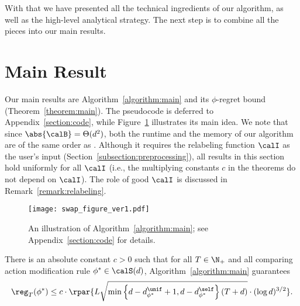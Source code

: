 \documentclass[10pt]{article}
\begin{document}
With that we have presented all the technical ingredients of our algorithm, as well as the high-level analytical strategy. The next step is to combine all the pieces into our main results. 

\section{Main Result}\label{section:main}

Our main results are Algorithm~\ref{algorithm:main} and its $\phi$-regret bound (Theorem~\ref{theorem:main}). The pseudocode is deferred to Appendix~\ref{section:code}, while Figure~\ref{fig:algorithm} illustrates its main idea. We note that since $\abs{\calB}=\Theta(d^2)$, both the runtime and the memory of our algorithm are of the same order as \citep{blum2007external}. Although it requires the relabeling function $\calI$ as the user's input (Section~\ref{subsection:preprocessing}), all results in this section hold uniformly for all $\calI$ (i.e., the multiplying constants $c$ in the theorems do not depend on $\calI$). The role of good $\calI$ is discussed in Remark~\ref{remark:relabeling}. 

\begin{figure}[ht]
    \centering
    \texttt{[image: swap\_figure\_ver1.pdf]}
    \caption{An illustration of Algorithm~\ref{algorithm:main}; see Appendix~\ref{section:code} for details. }
    \label{fig:algorithm}
\end{figure}

\begin{theorem}\label{theorem:main}
There is an absolute constant $c>0$ such that for all $T\in\N_+$ and all comparing action modification rule $\phi^*\in\calS(d)$, Algorithm~\ref{algorithm:main} guarantees
\begin{equation*}
\reg_T(\phi^*)\leq c\cdot\rpar{L\sqrt{\min\left\{d-d^\unif_{\phi^*}+1,d-d^\self_{\phi^*}\right\}(T+d)}\cdot(\log d)^{3/2}}.
\end{equation*}
\end{theorem}
\end{document}
